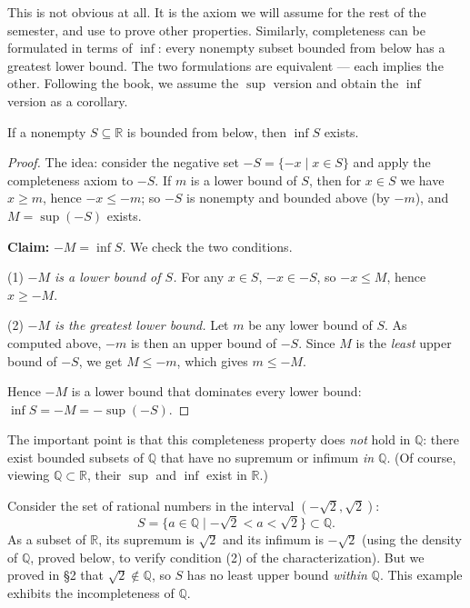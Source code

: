 \documentclass[11pt]{report}
\begin{document}
This is not obvious at all. It is the axiom we will assume for the rest of the semester, and use to prove other properties. Similarly, completeness can be formulated in terms of $\inf$: every nonempty subset bounded from below has a greatest lower bound. The two formulations are equivalent --- each implies the other. Following the book, we assume the $\sup$ version and obtain the $\inf$ version as a corollary.

\begin{corbox}
If a nonempty $S \subseteq \mathbb{R}$ is bounded from below, then $\inf S$ exists.
\end{corbox}

\begin{proof}
The idea: consider the negative set $-S = \{-x \mid x \in S\}$ and apply the completeness axiom to $-S$. If $m$ is a lower bound of $S$, then for $x \in S$ we have $x \geq m$, hence $-x \leq -m$; so $-S$ is nonempty and bounded above (by $-m$), and $M = \sup(-S)$ exists.

\textbf{Claim:} $-M = \inf S$. We check the two conditions.

(1) \emph{$-M$ is a lower bound of $S$.} For any $x \in S$, $-x \in -S$, so $-x \leq M$, hence $x \geq -M$.

(2) \emph{$-M$ is the greatest lower bound.} Let $m$ be any lower bound of $S$. As computed above, $-m$ is then an upper bound of $-S$. Since $M$ is the \emph{least} upper bound of $-S$, we get $M \leq -m$, which gives $m \leq -M$.

Hence $-M$ is a lower bound that dominates every lower bound: $\inf S = -M = -\sup(-S)$.
\end{proof}

The important point is that this completeness property does \emph{not} hold in $\mathbb{Q}$: there exist bounded subsets of $\mathbb{Q}$ that have no supremum or infimum \emph{in $\mathbb{Q}$}. (Of course, viewing $\mathbb{Q} \subset \mathbb{R}$, their $\sup$ and $\inf$ exist in $\mathbb{R}$.)

\begin{exbox}
Consider the set of rational numbers in the interval $(-\sqrt{2}, \sqrt{2})$:
\[
S = \{a \in \mathbb{Q} \mid -\sqrt{2} < a < \sqrt{2}\} \subset \mathbb{Q}.
\]
As a subset of $\mathbb{R}$, its supremum is $\sqrt{2}$ and its infimum is $-\sqrt{2}$ (using the density of $\mathbb{Q}$, proved below, to verify condition (2) of the characterization). But we proved in \S 2 that $\sqrt{2} \notin \mathbb{Q}$, so $S$ has no least upper bound \emph{within} $\mathbb{Q}$. This example exhibits the incompleteness of $\mathbb{Q}$.
\end{exbox}
\end{document}
